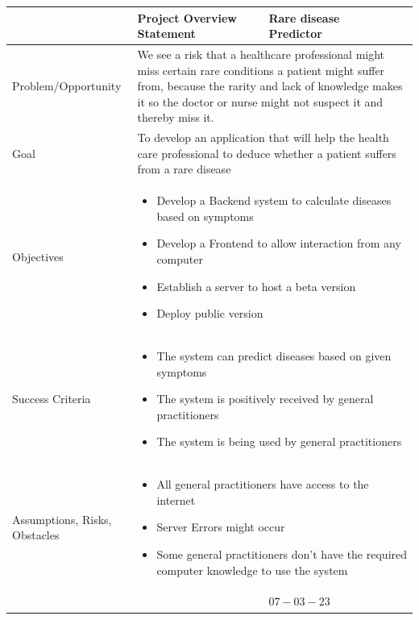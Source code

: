\begin{center}
	\begin{tabular}[h]{|p{7em}|p{5em}|p{5em}|p{5em}|p{5em}|}
		\hline
		& {\scriptsize Project Overview Statement} & {\scriptsize Rare disease Predictor} & & {\scriptsize } \\ \hline
		{\scriptsize Problem/Opportunity} & \multicolumn{4}{|p{20em}|}{\scriptsize We see a risk that a healthcare professional might miss certain rare conditions a patient might suffer from, because the rarity and lack of knowledge makes it so the doctor or nurse might not suspect it and thereby miss it.}\\ \hline
		{\scriptsize Goal} & \multicolumn{4}{|p{20em}|}{\scriptsize To develop an application that will help the health care professional to deduce whether a patient suffers from a rare disease}\\ \hline
		{\scriptsize Objectives} & \multicolumn{4}{|p{20em}|}{\scriptsize \begin{itemize}
				\item Develop a Backend system to calculate diseases based on symptoms
				\item Develop a Frontend to allow interaction from any computer
				\item Establish a server to host a beta version
				\item Deploy public version
			\end{itemize}
		} \\ \hline
		{\scriptsize Success Criteria} & \multicolumn{4}{|p{20em}|}{\scriptsize\begin{itemize}
				\item The system can predict diseases based on given symptoms
				\item The system is positively received by general practitioners
				\item The system is being used by general practitioners
		\end{itemize}} \\ \hline
		{\scriptsize Assumptions, Risks, Obstacles} & \multicolumn{4}{|p{20em}|}{\scriptsize
			\begin{itemize}
				\item All general practitioners have access to the internet
				\item Server Errors might occur
				\item Some general practitioners don't have the required computer knowledge to use the system
			\end{itemize}	
		}\\ \hline
		& {\scriptsize } & {\scriptsize $07-03-23$} & & \\ \hline
	\end{tabular}
\end{center}
